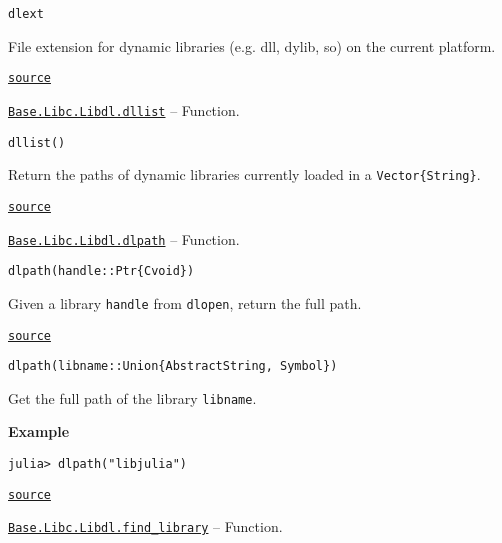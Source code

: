 \begin{adjustwidth}{2em}{0pt}


\begin{verbatim}
dlext
\end{verbatim}

File extension for dynamic libraries (e.g. dll, dylib, so) on the current platform.



\href{https://github.com/JuliaLang/julia/blob/9058264a69f9efc1af805c4473c946f87859b731/base/libdl.jl#L252-L256}{\texttt{source}}


\end{adjustwidth}
\hypertarget{12989797534170552816}{}
\hyperlink{12989797534170552816}{\texttt{Base.Libc.Libdl.dllist}}  -- {Function.}

\begin{adjustwidth}{2em}{0pt}


\begin{verbatim}
dllist()
\end{verbatim}

Return the paths of dynamic libraries currently loaded in a \texttt{Vector\{String\}}.



\href{https://github.com/JuliaLang/julia/blob/9058264a69f9efc1af805c4473c946f87859b731/base/libdl.jl#L283-L287}{\texttt{source}}


\end{adjustwidth}
\hypertarget{4747308011292348995}{}
\hyperlink{4747308011292348995}{\texttt{Base.Libc.Libdl.dlpath}}  -- {Function.}

\begin{adjustwidth}{2em}{0pt}


\begin{verbatim}
dlpath(handle::Ptr{Cvoid})
\end{verbatim}

Given a library \texttt{handle} from \texttt{dlopen}, return the full path.



\href{https://github.com/JuliaLang/julia/blob/9058264a69f9efc1af805c4473c946f87859b731/base/libdl.jl#L214-L218}{\texttt{source}}



\begin{lstlisting}
dlpath(libname::Union{AbstractString, Symbol})
\end{lstlisting}

Get the full path of the library \texttt{libname}.

\textbf{Example}


\begin{verbatim}
julia> dlpath("libjulia")
\end{verbatim}



\href{https://github.com/JuliaLang/julia/blob/9058264a69f9efc1af805c4473c946f87859b731/base/libdl.jl#L226-L235}{\texttt{source}}


\end{adjustwidth}
\hypertarget{4801728612391631118}{}
\hyperlink{4801728612391631118}{\texttt{Base.Libc.Libdl.find\_library}}  -- {Function.}

